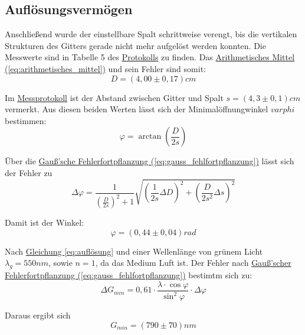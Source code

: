 \subsection{Auflösungsvermögen}
\label{ssec:aufloesung}

Anschließend wurde der einstellbare Spalt schrittweise verengt, bis die vertikalen Strukturen des Gitters gerade nicht mehr aufgelöst werden konnten. Die Messwerte sind in Tabelle 5 des \hyperref[Protokoll]{Protokolls} zu finden. Das \hyperref[eq:arithmetisches_mittel]{Arithmetisches Mittel (\ref*{eq:arithmetisches_mittel})} und sein Fehler sind somit:
\begin{equation}
    D = (4,00 \pm 0,17) cm
\end{equation}

Im \hyperref[Protokoll]{Messprotokoll} ist der Abstand zwischen Gitter und Spalt $s = (4,3 \pm 0,1) cm$ vermerkt. Aus diesen beiden Werten lässt sich der Minimalöffnungwinkel $varphi$ bestimmen:
\begin{equation}
    \varphi = \arctan \left(\frac{D}{2s}\right) 
\end{equation}

Über die \hyperref[eq:gauss_fehlfortpflanzung]{Gauß'sche Fehlerfortpflanzung (\ref*{eq:gauss_fehlfortpflanzung})} lässt sich der Fehler zu
\begin{equation}
    \Delta \varphi = \frac{1}{\left(\frac{D}{2s}\right)^2 + 1} \sqrt{\left(\frac{1}{2s} \Delta D\right)^2 + \left(\frac{D}{2s^2} \Delta s\right)^2}
\end{equation}

Damit ist der Winkel:
\begin{equation}
\boxed{
    \varphi = (0,44 \pm 0,04) rad
}
\end{equation}

Nach \hyperref[eq:auflösung]{Gleichung \ref*{eq:auflösung}} und einer Wellenlänge von grünem Licht $\lambda_g = 550nm$, sowie $n=1$, da das Medium Luft ist. Der Fehler nach \hyperref[eq:gauss_fehlfortpflanzung]{Gauß'scher Fehlerfortpflanzung (\ref*{eq:gauss_fehlfortpflanzung})} bestimtm sich zu:
\begin{equation}
    \Delta G_{min} = 0,61 \cdot \frac{\lambda \cdot \cos\varphi}{\sin^2\varphi} \cdot \Delta \varphi
\end{equation}

Daraus ergibt sich
\begin{equation}
    G_{min} = (790 \pm 70) nm
\end{equation}

